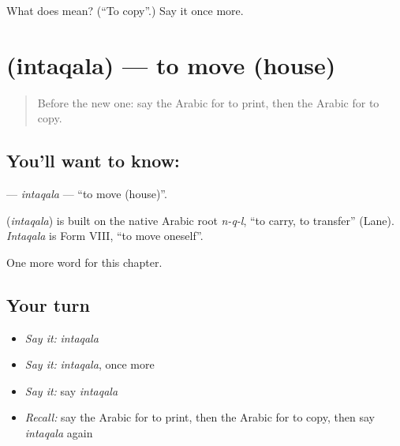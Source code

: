 \begin{tcolorbox}[breakable,colback=teal!4,colframe=teal!35!black,title={Before you move on}]
What does  mean? (\textquotedblleft{}To copy\textquotedblright{}.) Say it once more.
\end{tcolorbox}
\section[\texorpdfstring{\ar{انتقل} (intaqala)}{انتقل (intaqala)}]{ (intaqala) — to move (house)}

\label{lesson:AR-C162-intaqala}



\begin{quote}
Before the new one: say the Arabic for to print, then the Arabic for to copy.
\end{quote}

\subsection*{You'll want to know: }
\textbf{} — \emph{intaqala} — \textquotedblleft{}to move (house)\textquotedblright{}.

\begin{cousinweb}
\textbf{} (\emph{intaqala}) is built on the native Arabic root \emph{n-q-l}, \textquotedblleft{}to carry, to transfer\textquotedblright{} (Lane). \emph{Intaqala} is Form VIII, \textquotedblleft{}to move oneself\textquotedblright{}.
\end{cousinweb}

\begin{grammarlens}[title={What you've built}]
One more word for this chapter.
\end{grammarlens}

\subsection*{Your turn}
\begin{itemize}
\raggedright
  \item \emph{Say it:} \emph{intaqala}
  \item \emph{Say it:} \emph{intaqala}, once more
  \item \emph{Say it:} say \emph{intaqala}
  \item \emph{Recall:} say the Arabic for to print, then the Arabic for to copy, then say \emph{intaqala} again
\end{itemize}

